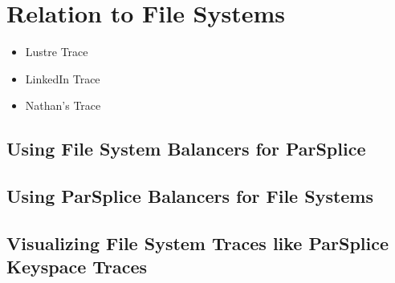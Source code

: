 \section{Relation to File Systems}

\begin{itemize}
  \item Lustre Trace
  \item LinkedIn Trace
  \item Nathan's Trace
\end{itemize}

\subsection{Using File System Balancers for ParSplice}
\subsection{Using ParSplice Balancers for File Systems}
\subsection{Visualizing File System Traces like ParSplice Keyspace Traces}
